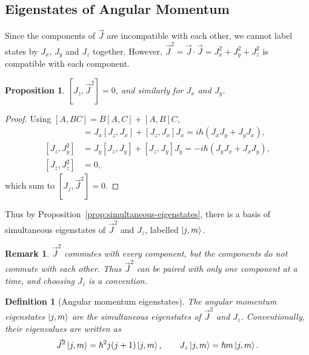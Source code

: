 \documentclass{article}
\newtheorem{definition}{Definition}
\newtheorem{remark}{Remark}
\newtheorem{proposition}{Proposition}
\begin{document}
\subsection{Eigenstates of Angular Momentum}
Since the components of $\vec{J}$ are incompatible with each other, we cannot label states by $J_x$, $J_y$ and $J_z$ together. However, $\vec{J}^2 = \vec{J}\cdot\vec{J} = J_x^2 + J_y^2 + J_z^2$ is compatible with each component.
\begin{proposition}
    \label{prop:J2-Jz}
    $[J_z, \vec{J}^2] = 0$, and similarly for $J_x$ and $J_y$.
\end{proposition}
\begin{proof}
    Using $[A,BC] = B[A,C] + [A,B]C$,
    \begin{align*}
        [J_z, J_x^2] &= J_x[J_z,J_x] + [J_z,J_x]J_x = i\hbar(J_xJ_y + J_yJ_x),\\
        [J_z, J_y^2] &= J_y[J_z,J_y] + [J_z,J_y]J_y = -i\hbar(J_yJ_x + J_xJ_y),\\
        [J_z, J_z^2] &= 0,
    \end{align*}
    which sum to $[J_z, \vec{J}^2] = 0$.
\end{proof}
Thus by Proposition~\ref{prop:simultaneous-eigenstates}, there is a basis of simultaneous eigenstates of $\vec{J}^2$ and $J_z$, labelled $\ket{j,m}$.
\begin{remark}
    $\vec{J}^2$ commutes with every component, but the components do not commute with each other. Thus $\vec{J}^2$ can be paired with only one component at a time, and choosing $J_z$ is a convention.
\end{remark}
\begin{definition}[Angular momentum eigenstates]
    The angular momentum eigenstates $\ket{j,m}$ are the simultaneous eigenstates of $\vec{J}^2$ and $J_z$. Conventionally, their eigenvalues are written as
    \begin{equation}
        \vec{J}^2\ket{j,m} = \hbar^2 j(j+1)\ket{j,m}, \qquad J_z\ket{j,m} = \hbar m\ket{j,m}.
    \end{equation}
\end{definition}
\end{document}
